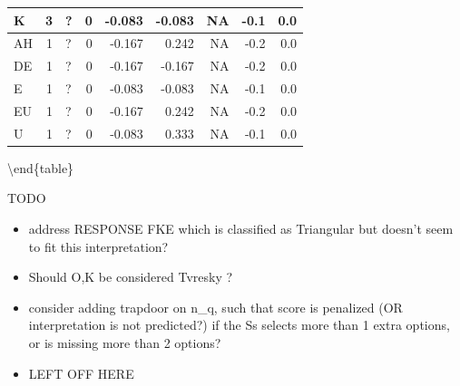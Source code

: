 \documentclass[
  letterpaper,
  DIV=11,
  numbers=noendperiod]{scrreprt}
\providecommand{\tightlist}{%
  \setlength{\itemsep}{0pt}\setlength{\parskip}{0pt}}\usepackage{longtable,booktabs,array}
\begin{document}
\begin{tabular}[t]{l|r|l|r|r|r|r|r|r}
\hline
\hspace{1em}K & 3 & ? & 0 & -0.083 & -0.083 & NA & -0.1 & 0.0\\
\hline
\hspace{1em}AH & 1 & ? & 0 & -0.167 & 0.242 & NA & -0.2 & 0.0\\
\hline
\hspace{1em}DE & 1 & ? & 0 & -0.167 & -0.167 & NA & -0.2 & 0.0\\
\hline
\hspace{1em}E & 1 & ? & 0 & -0.083 & -0.083 & NA & -0.1 & 0.0\\
\hline
\hspace{1em}EU & 1 & ? & 0 & -0.167 & 0.242 & NA & -0.2 & 0.0\\
\hline
\hspace{1em}U & 1 & ? & 0 & -0.083 & 0.333 & NA & -0.1 & 0.0\\
\hline
\end{tabular}

\textbackslash end\{table\}

TODO

\begin{itemize}
\tightlist
\item
  address RESPONSE FKE which is classified as Triangular but doesn't
  seem to fit this interpretation?
\item
  Should O,K be considered Tvresky ?
\item
  consider adding trapdoor on n\_q, such that score is penalized (OR
  interpretation is not predicted?) if the Ss selects more than 1 extra
  options, or is missing more than 2 options?
\item
  LEFT OFF HERE
\end{itemize}
\end{document}
